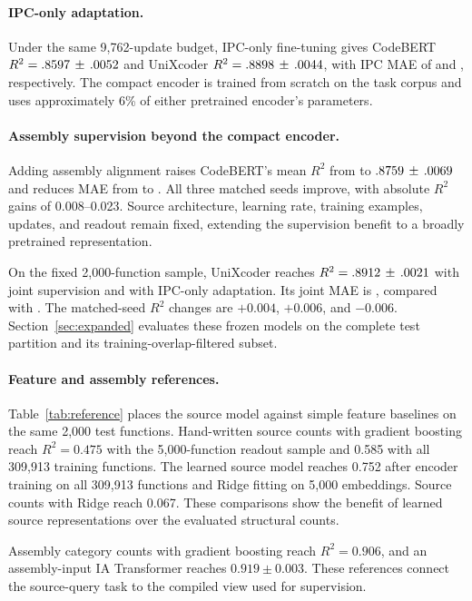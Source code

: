 \documentclass[conference]{IEEEtran}
\newenvironment{newtext}{\begingroup}{\endgroup}
\newcommand{\Rsq}{R^{2}}
\begin{document}
\paragraph{IPC-only adaptation.}
Under the same 9,762-update budget, IPC-only fine-tuning gives CodeBERT $\Rsq=\CBIPCRCell$ and UniXcoder $\Rsq=\UXIPCRCell$, with IPC MAE of \CBIPCMAE{} and \UXIPCMAE{}, respectively. The compact encoder is trained from scratch on the task corpus and uses approximately 6\% of either pretrained encoder's parameters.

\paragraph{Assembly supervision beyond the compact encoder.}
Adding assembly alignment raises CodeBERT's mean $\Rsq$ from \CBIPCR{} to $.8759\,\pm\,.0069$ and reduces MAE from \CBIPCMAE{} to \CBJointMAE{}. All three matched seeds improve, with absolute $\Rsq$ gains of 0.008--0.023. Source architecture, learning rate, training examples, updates, and readout remain fixed, extending the supervision benefit to a broadly pretrained representation.

On the fixed 2,000-function sample, UniXcoder reaches $\Rsq=\UXJointRCell$ with joint supervision and \UXIPCR{} with IPC-only adaptation. Its joint MAE is \UXJointMAE{}, compared with \UXIPCMAE{}. The matched-seed $\Rsq$ changes are $+0.004$, $+0.006$, and $-0.006$. Section~\ref{sec:expanded} evaluates these frozen models on the complete test partition and its training-overlap-filtered subset.





\begin{newtext}
\paragraph{Feature and assembly references.}
Table~\ref{tab:reference} places the source model against simple feature baselines on the same 2,000 test functions. Hand-written source counts with gradient boosting reach $\Rsq=0.475$ with the 5,000-function readout sample and 0.585 with all 309,913 training functions. The learned source model reaches 0.752 after encoder training on all 309,913 functions and Ridge fitting on 5,000 embeddings. Source counts with Ridge reach 0.067. These comparisons show the benefit of learned source representations over the evaluated structural counts.

Assembly category counts with gradient boosting reach $\Rsq=0.906$, and an assembly-input IA Transformer reaches $0.919\pm0.003$. These references connect the source-query task to the compiled view used for supervision.

\end{newtext}
\end{document}
